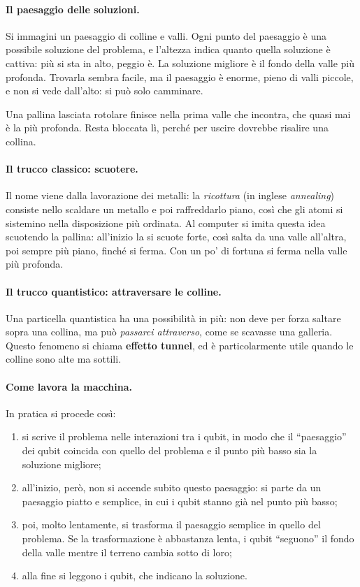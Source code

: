 \paragraph{Il paesaggio delle soluzioni.} Si immagini un paesaggio di colline
e valli. Ogni punto del paesaggio è una possibile soluzione del problema, e
l'altezza indica quanto quella soluzione è cattiva: più si sta in alto, peggio
è. La soluzione migliore è il fondo della valle più profonda. Trovarla sembra
facile, ma il paesaggio è enorme, pieno di valli piccole, e non si vede
dall'alto: si può solo camminare.

Una pallina lasciata rotolare finisce nella prima valle che incontra, che
quasi mai è la più profonda. Resta bloccata lì, perché per uscire dovrebbe
risalire una collina.

\paragraph{Il trucco classico: scuotere.} Il nome viene dalla lavorazione dei
metalli: la \textit{ricottura} (in inglese \textit{annealing}) consiste nello
scaldare un metallo e poi raffreddarlo piano, così che gli atomi si
sistemino nella disposizione più ordinata. Al computer si imita questa idea
scuotendo la pallina: all'inizio la si scuote forte, così salta da una valle
all'altra, poi sempre più piano, finché si ferma. Con un po' di fortuna si
ferma nella valle più profonda.

\paragraph{Il trucco quantistico: attraversare le colline.} Una particella
quantistica ha una possibilità in più: non deve per forza saltare sopra una
collina, ma può \textit{passarci attraverso}, come se scavasse una galleria.
Questo fenomeno si chiama \textbf{effetto tunnel}, ed è particolarmente utile
quando le colline sono alte ma sottili.

\paragraph{Come lavora la macchina.} In pratica si procede così:

\begin{enumerate}
  \item si scrive il problema nelle interazioni tra i qubit, in modo che il
    ``paesaggio'' dei qubit coincida con quello del problema e il punto più
    basso sia la soluzione migliore;
  \item all'inizio, però, non si accende subito questo paesaggio: si parte da
    un paesaggio piatto e semplice, in cui i qubit stanno già nel punto più
    basso;
  \item poi, molto lentamente, si trasforma il paesaggio semplice in quello
    del problema. Se la trasformazione è abbastanza lenta, i qubit
    ``seguono'' il fondo della valle mentre il terreno cambia sotto di loro;
  \item alla fine si leggono i qubit, che indicano la soluzione.
\end{enumerate}


